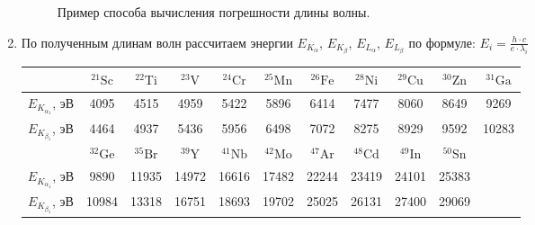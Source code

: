 \documentclass[a4paper, 12pt]{article}%
\begin{document}
\begin{enumerate}
	  	\begin{figure}[H]
		  	\caption{Пример способа вычисления погрешности длины волны.}
		  \end{figure}
		 

		 
		\item По полученным длинам волн рассчитаем энергии $E_{K_\alpha}$, $E_{K_\beta}$, $E_{L_\alpha}$, $E_{L_\beta}$ по формуле: $E_i = \frac{h \cdot c}{e\cdot\lambda_i} $
		
		
		\begin{longtable}{|c|c|c|c|c|c|c|c|c|c|c|}
			\hline
			& ${ }^{21} \mathrm{Sc}$ & ${ }^{22} \mathrm{Ti}$ & ${}^{23} \mathrm{V}$ & ${ }^{24} \mathrm{Cr}$ & ${ }^{25} \mathrm{Mn}$ & ${ }^{26} \mathrm{Fe}$ & ${ }^{28} \mathrm{Ni}$ & ${ }^{29} \mathrm{Cu}$ & ${ }^{30} \mathrm{Zn}$ & ${ }^{31} \mathrm{Ga}$ \\ \hline
			
			$E_{K_{\alpha_1}}$, эВ & 4095 & 4515 & 4959 & 5422 & 5896 & 6414 & 7477 & 8060 & 8649 & 9269 \\ \hline
			$E_{K_{\beta_1}}$, эВ & 4464 &  4937 &  5436 &  5956 &  6498 &  7072 &  8275 &  8929 &  9592 &  10283
			 \\ \hline
			\hline
			& ${ }^{32} \mathrm{Ge}$ & ${}^{35} \mathrm{Br}$ & ${ }^{39} \mathrm{Y}$ & ${ }^{41} \mathrm{Nb}$ & ${ }^{42} \mathrm{Mo}$ & ${ }^{47} \mathrm{Ar}$ & ${ }^{48} \mathrm{Cd}$ & ${ }^{49} \mathrm{In}$ & ${ }^{50} \mathrm{Sn}$ & \\ \hline
			
			$E_{K_{\alpha_1}}$, эВ & 9890 & 11935 & 14972 & 16616 & 17482 & 22244 & 23419 & 24101 & 25383 &\\ \hline
			$E_{K_{\beta_1}}$, эВ &   10984 &  13318 &  16751 &  18693 &  19702 &  25025 &  26131 &  27400 &  29069 & \\ 
			\hline
			\hline
			

\end{longtable}
\end{enumerate}
\end{document}
